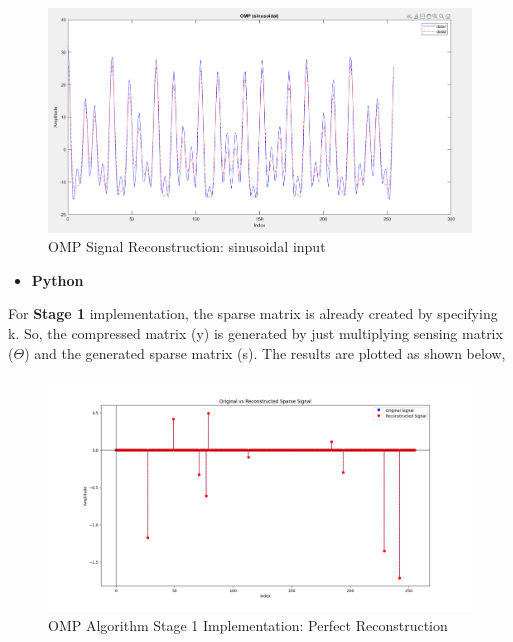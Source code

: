 \documentclass[
  letterpaper,
  DIV=11,
  numbers=noendperiod]{scrartcl}
\providecommand{\tightlist}{%
  \setlength{\itemsep}{0pt}\setlength{\parskip}{0pt}}
\begin{document}
\begin{figure}[H]

{\centering \includegraphics[width=0.8\linewidth,height=\textheight,keepaspectratio]{abar-cs_files/mediabag/omp_sine1.png}

}

\caption{OMP Signal Reconstruction: sinusoidal input}

\end{figure}%

\begin{itemize}
\tightlist
\item
  \textbf{Python}
\end{itemize}

For \textbf{Stage 1} implementation, the sparse matrix is already
created by specifying k. So, the compressed matrix (y) is generated by
just multiplying sensing matrix (\(\Theta\)) and the generated sparse
matrix (s). The results are plotted as shown below,

\begin{figure}[H]

{\centering \includegraphics[width=0.8\linewidth,height=\textheight,keepaspectratio]{abar-cs_files/mediabag/omp-alg-256.png}

}

\caption{OMP Algorithm Stage 1 Implementation: Perfect Reconstruction}

\end{figure}%
\end{document}
